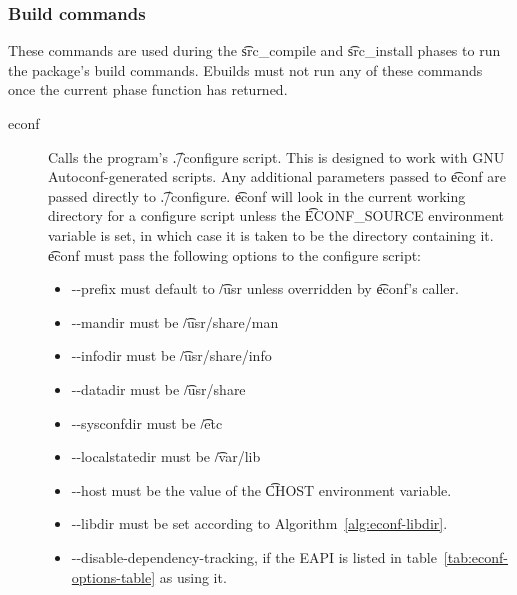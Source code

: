 \subsubsection{Build commands}
These commands are used during the \t{src\_compile} and \t{src\_install} phases to run the
package's build commands. Ebuilds must not run any of these commands once the current phase function
has returned.

\begin{description}
\item[econf] Calls the program's \t{./configure} script. This is designed to work with GNU
    Autoconf-generated scripts. Any additional parameters passed to \t{econf} are passed directly
    to \t{./configure}. \t{econf} will look in the current working directory for a configure script
    unless the \t{ECONF\_SOURCE} environment variable is set, in which case it is taken to be the
    directory containing it. \t{econf} must pass the following options to the configure script:

    \begin{itemize}
    \item -{}-prefix must default to \t{/usr} unless overridden by \t{econf}'s caller.
    \item -{}-mandir must be \t{/usr/share/man}
    \item -{}-infodir must be \t{/usr/share/info}
    \item -{}-datadir must be \t{/usr/share}
    \item -{}-sysconfdir must be \t{/etc}
    \item -{}-localstatedir must be \t{/var/lib}
    \item -{}-host must be the value of the \t{CHOST} environment variable.
    \item -{}-libdir must be set according to Algorithm~\ref{alg:econf-libdir}.
    \item -{}-disable-dependency-tracking, if the EAPI is listed in
        table~\ref{tab:econf-options-table} as using it.
    \end{itemize}


\end{description}
